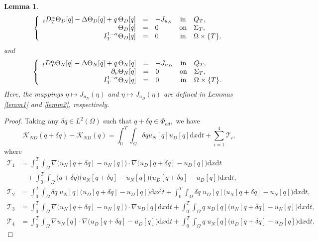 \documentclass[a4paper,12pt,reqno,natbib]{amsart}
\newtheorem{lemma}[theorem]{Lemma}
\newcommand{\dx} {\displaystyle\mathrm{d}x}
\newcommand{\dt} {\displaystyle\mathrm{d}t}
\begin{document}
{\begin{lemma}
\begin{eqnarray} \label{adjoint_ND}
 \left\{
   \begin{array}{rclcl}
      {}_tD^{\alpha}_T \Theta_D[q]-\Delta  \Theta_D[q] +q\,\Theta_D[q] &=&- J_{u_N} & \hbox{in} & Q_T, \\
 \Theta_D[q]&=&0 &\hbox{on} & \Sigma_T,\\
 I^{1-\alpha}_{T}\Theta_D[q]&=&0 &\hbox{in} & \Omega\times\{T\},
   \end{array}
 \right.
 \end{eqnarray}
and
\begin{eqnarray} \label{adjoint_ND2}
 \left\{
   \begin{array}{rclcl}
      {}_tD^{\alpha}_T \Theta_N[q]-\Delta  \Theta_N[q] +q\, \Theta_N[q] &=&- J_{u_D} & \hbox{in} & Q_T, \\
 \partial_\nu \Theta_N[q]&=&0 &\hbox{on} & \Sigma_T,\\
 I^{1-\alpha}_{T}\Theta_N[q]&=&0 &\hbox{in} & \Omega\times\{T\}.
   \end{array}
 \right.
 \end{eqnarray}
Here, the mappings $\eta\mapsto J_{u_N}(\eta)$ and $\eta\mapsto J_{u_D}(\eta)$ are defined in Lemmas \ref{lemm1} and \ref{lemm2}, respectively.
\end{lemma}
\begin{proof}
Taking any $\delta q \in L^2(\Omega)$  such that $q+\delta q \in \Phi_{ad},$ we have
\begin{equation*}
    \mathcal{K}_{ND}(q+\delta q) - \mathcal{K}_{ND}(q) =\int_0^T\int_{\Omega} \delta q u_N[q] u_D[q]\dx\dt+ \sum_{i=1}^4\mathcal{T}_i,
\end{equation*}
where
\begin{align*}
    \mathcal{T}_1 &= \int_0^T\int_{\Omega} \nabla\Big( u_N[q+\delta q]- u_N[q]\Big)\cdot\nabla\Big( u_D[q+\delta q]- u_D[q]\Big)\dx\dt\\
    \;&\;\;\; +\int_0^T\int_{\Omega} \Big(q+\delta q\Big)\Big( u_N[q+\delta q]- u_N[q]\Big)\Big( u_D[q+\delta q]- u_D[q]\Big)\dx\dt,\\
    \mathcal{T}_2 &= \int_0^T\int_{\Omega} \delta q\; u_N[q]\Big( u_D[q+\delta q]- u_D[q]\Big)\dx\dt+\int_0^T\int_{\Omega} \delta q\; u_D[q]\Big( u_N[q+\delta q]- u_N[q]\Big)\dx\dt,\\
    \mathcal{T}_3 &= \int_0^T\int_{\Omega} \nabla\Big( u_N[q+\delta q]- u_N[q]\Big)\cdot\nabla u_D[q]\dx\dt+  \int_0^T\int_{\Omega} q\; u_D[q]\Big( u_N[q+\delta q]- u_N[q]\Big)\dx\dt,\\
    \mathcal{T}_4 &= \int_0^T\int_{\Omega} \nabla u_N[q]\cdot\nabla\Big( u_D[q+\delta q]- u_D[q]\Big)\dx\dt + \int_0^T\int_{\Omega} q\; u_N[q]\Big( u_D[q+\delta q]- u_D[q]\Big)\dx\dt.
\end{align*}


\end{proof}}
\end{document}
